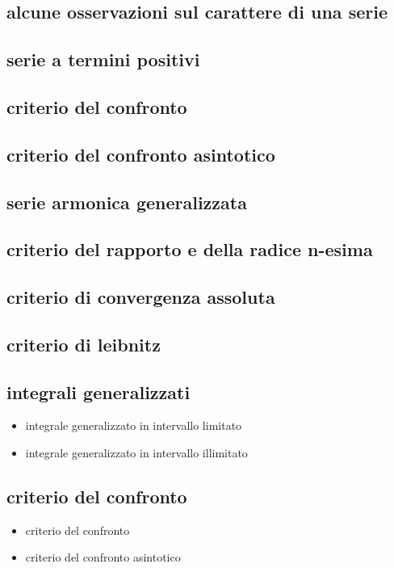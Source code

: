 \documentclass{article}
\theoremstyle{mystyle}
\begin{document}
\subsection{alcune osservazioni sul carattere di una serie}
\subsection{serie a termini positivi}
\subsection{criterio del confronto}
\subsection{criterio del confronto asintotico}
\subsection{serie armonica generalizzata}
\subsection{criterio del rapporto e della radice n-esima}
\subsection{criterio di convergenza assoluta}
\subsection{criterio di leibnitz}
\subsection{integrali generalizzati}
\begin{itemize}
    \item integrale generalizzato in intervallo limitato
    \item integrale generalizzato in intervallo illimitato
\end{itemize}
\subsection{criterio del confronto}
\begin{itemize}
    \item criterio del confronto
    \item criterio del confronto asintotico
\end{itemize}
\end{document}
